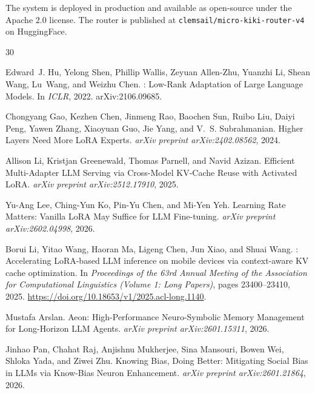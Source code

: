 \documentclass[11pt,a4paper]{article}
\begin{document}
The system is deployed in production and available as open-source under the Apache 2.0 license. The router is published at \texttt{clemsail/micro-kiki-router-v4} on HuggingFace.



\begin{thebibliography}{30}

Edward~J. Hu, Yelong Shen, Phillip Wallis, Zeyuan Allen-Zhu, Yuanzhi Li, Shean Wang, Lu~Wang, and Weizhu Chen.
: Low-Rank Adaptation of Large Language Models.
\newblock In \emph{ICLR}, 2022.
\newblock arXiv:2106.09685.

Chongyang Gao, Kezhen Chen, Jinmeng Rao, Baochen Sun, Ruibo Liu, Daiyi Peng, Yawen Zhang, Xiaoyuan Guo, Jie Yang, and V.~S. Subrahmanian.
\newblock Higher Layers Need More {LoRA} Experts.
\newblock \emph{arXiv preprint arXiv:2402.08562}, 2024.

Allison Li, Kristjan Greenewald, Thomas Parnell, and Navid Azizan.
\newblock Efficient Multi-Adapter {LLM} Serving via Cross-Model {KV}-Cache Reuse with Activated {LoRA}.
\newblock \emph{arXiv preprint arXiv:2512.17910}, 2025.

Yu-Ang Lee, Ching-Yun Ko, Pin-Yu Chen, and Mi-Yen Yeh.
\newblock Learning Rate Matters: Vanilla {LoRA} May Suffice for {LLM} Fine-tuning.
\newblock \emph{arXiv preprint arXiv:2602.04998}, 2026.

Borui Li, Yitao Wang, Haoran Ma, Ligeng Chen, Jun Xiao, and Shuai Wang.
: Accelerating {LoRA}-based {LLM} inference on mobile devices via context-aware {KV} cache optimization.
\newblock In \emph{Proceedings of the 63rd Annual Meeting of the Association for Computational Linguistics (Volume 1: Long Papers)}, pages 23400--23410, 2025.
\newblock \url{https://doi.org/10.18653/v1/2025.acl-long.1140}.

Mustafa Arslan.
\newblock Aeon: High-Performance Neuro-Symbolic Memory Management for Long-Horizon {LLM} Agents.
\newblock \emph{arXiv preprint arXiv:2601.15311}, 2026.

Jinhao Pan, Chahat Raj, Anjishnu Mukherjee, Sina Mansouri, Bowen Wei, Shloka Yada, and Ziwei Zhu.
\newblock Knowing Bias, Doing Better: Mitigating Social Bias in {LLMs} via Know-Bias Neuron Enhancement.
\newblock \emph{arXiv preprint arXiv:2601.21864}, 2026.


\end{thebibliography}
\end{document}
